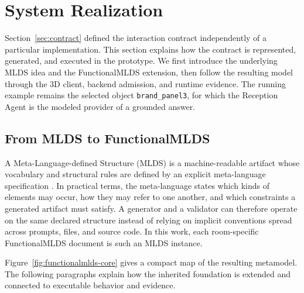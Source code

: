 \section{System Realization}
\label{sec:implementation}

Section~\ref{sec:contract} defined the interaction contract independently of a
particular implementation.  This section explains how the contract is represented,
generated, and executed in the prototype.  We first introduce the underlying MLDS
idea and the FunctionalMLDS extension, then follow the resulting model through the
3D client, backend admission, and runtime evidence.  The running example remains the
selected object \texttt{brand\_panel3}, for which the Reception Agent is the modeled
provider of a grounded answer.

\subsection{From MLDS to FunctionalMLDS}

A Meta-Language-defined Structure (MLDS) is a machine-readable artifact whose
vocabulary and structural rules are defined by an explicit meta-language
specification \cite{fischer2025machinereadable}.  In practical terms, the
meta-language states which kinds of elements may occur, how they may refer to one
another, and which constraints a generated artifact must satisfy.  A generator and
a validator can therefore operate on the same declared structure instead of relying
on implicit conventions spread across prompts, files, and source code.  In this work,
each room-specific FunctionalMLDS document is such an MLDS instance.

Figure~\ref{fig:functionalmlds-core} gives a compact map of the resulting
metamodel.  The following paragraphs explain how the inherited foundation is
extended and connected to executable behavior and evidence.

